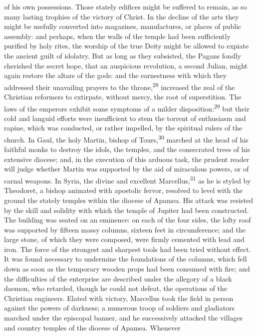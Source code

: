 of his own possessions. Those stately edifices might be suffered
to remain, as so many lasting trophies of the victory of Christ.
In the decline of the arts they might be usefully converted into
magazines, manufactures, or places of public assembly: and
perhaps, when the walls of the temple had been sufficiently
purified by holy rites, the worship of the true Deity might be
allowed to expiate the ancient guilt of idolatry. But as long as
they subsisted, the Pagans fondly cherished the secret hope, that
an auspicious revolution, a second Julian, might again restore
the altars of the gods: and the earnestness with which they
addressed their unavailing prayers to the throne,\textsuperscript{28} increased
the zeal of the Christian reformers to extirpate, without mercy,
the root of superstition. The laws of the emperors exhibit some
symptoms of a milder disposition:\textsuperscript{29} but their cold and languid
efforts were insufficient to stem the torrent of enthusiasm and
rapine, which was conducted, or rather impelled, by the spiritual
rulers of the church. In Gaul, the holy Martin, bishop of Tours,\textsuperscript{30}
marched at the head of his faithful monks to destroy the
idols, the temples, and the consecrated trees of his extensive
diocese; and, in the execution of this arduous task, the prudent
reader will judge whether Martin was supported by the aid of
miraculous powers, or of carnal weapons. In Syria, the divine and
excellent Marcellus,\textsuperscript{31} as he is styled by Theodoret, a bishop
animated with apostolic fervor, resolved to level with the ground
the stately temples within the diocese of Apamea. His attack was
resisted by the skill and solidity with which the temple of
Jupiter had been constructed. The building was seated on an
eminence: on each of the four sides, the lofty roof was supported
by fifteen massy columns, sixteen feet in circumference; and the
large stone, of which they were composed, were firmly cemented
with lead and iron. The force of the strongest and sharpest tools
had been tried without effect. It was found necessary to
undermine the foundations of the columns, which fell down as soon
as the temporary wooden props had been consumed with fire; and
the difficulties of the enterprise are described under the
allegory of a black daemon, who retarded, though he could not
defeat, the operations of the Christian engineers. Elated with
victory, Marcellus took the field in person against the powers of
darkness; a numerous troop of soldiers and gladiators marched
under the episcopal banner, and he successively attacked the
villages and country temples of the diocese of Apamea. Whenever

